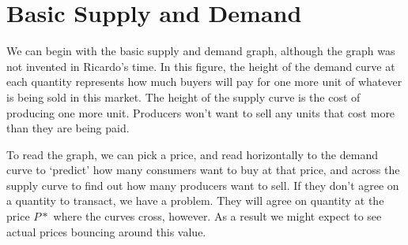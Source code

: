 \documentclass[11pt]{amsart}
\begin{document}
\section{Basic Supply and Demand}
We can begin with the basic supply and demand graph, although the graph was not invented in Ricardo's time. In this figure, the height of the demand curve at each quantity represents how much buyers will pay for  one more unit of whatever is being sold in this market. The height of the supply curve is the cost of producing one more unit. Producers won't want to sell any units that cost more than they are being paid.

To read the graph, we can pick a price, and read horizontally to the demand curve to `predict' how many consumers  want to buy at that price, and across  the supply curve to find out how many producers want to sell. If they don't agree on a quantity to transact, we have a problem. They will agree on quantity at the price $P*$ where the curves cross, however. As a result we might expect to see actual  prices bouncing around this value.
\end{document}
